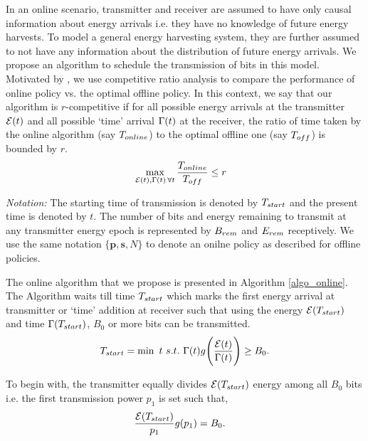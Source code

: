 In an online scenario, transmitter and receiver are assumed to have only causal information about energy arrivals i.e. they have no knowledge of future energy harvests. To model a general energy harvesting system, they are further assumed to not have any information about the distribution of future energy arrivals. We propose an algorithm to schedule the transmission of bits in this model. Motivated by \cite{VazeCompetitive}, we use competitive ratio analysis to compare the performance of online policy vs. the optimal offline policy. In this context, we say that our algorithm is $r$-competitive if for all possible energy arrivals at the transmitter $\mathcal{E}(t)$ and all possible `time' arrival $\Gamma(t)$ at the receiver, the ratio of time taken by the online algorithm (say $T_{\mbox{\scriptsize{online}}}$) to the optimal offline one (say $T_{\mbox{\scriptsize{off}}}$) is bounded by $r$.
\begin{align}
&\displaystyle\max_{\ETx(t),\TRx(t)\hspace{0.5mm} \forall t}\dfrac{T_{\mbox{\scriptsize{online}}}}{T_{\mbox{\scriptsize{off}}}}\le r
\end{align}
 
\textit{Notation:} The starting time of transmission is denoted by $T_{\mbox{\scriptsize{start}}}$ and the present time is denoted by $t$. The number of bits and energy remaining to transmit at any transmitter energy epoch is represented by $B_{\mbox{\scriptsize{rem}}}$ and $E_{\mbox{\scriptsize{rem}}}$ receptively. We use the same notation $\{\bm{p},\bm{s},N\}$ to denote an onilne policy as described for offline policies.

The online algorithm that we propose is presented in Algorithm \ref{algo_online}. The Algorithm waits till time $T_{\mbox{\scriptsize{start}}}$ which marks the first energy arrival at transmitter or `time' addition at receiver such that using the energy $\ETx(T_{\mbox{\scriptsize{start}}})$ and time $\TRx(T_{\mbox{\scriptsize{start}}})$, $B_0$ or more bits can be transmitted.
\begin{equation}
T_{\mbox{\scriptsize{start}}}=\min\ t \ s.t.\  \TRx(t)g\Bigg{(} \dfrac{\ETx(t)}{\TRx(t)}\Bigg{)}\ge B_0.\label{online_T_start}
\end{equation}

To begin with, the transmitter equally divides $\ETx(T_{\mbox{\scriptsize{start}}})$ energy among all $B_0$ bits i.e. the first transmission power $p_1$ is set such that,
\begin{align}
&\frac{\ETx(T_{\mbox{\scriptsize{start}}})}{p_1}g(p_1)=B_0.
\label{eq_online_first_power}
\end{align}

